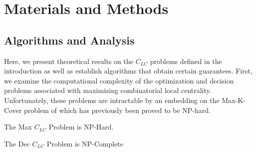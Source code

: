 
\section*{Materials and Methods}
\subsection*{Algorithms and Analysis}

Here, we present theoretical results on the $C_{LC}$ problems defined in the introduction as well as establish algorithms that obtain certain guarantees.  First, we examine the computational complexity of the optimization and decision problems associated with maximizing combinatorial local centrality.  Unfortunately, these problems are intractable by an embedding on the Max-K-Cover problem of \cite{feige98} which has previously been proved to be NP-hard.

\begin{thm}\label{nph-thm} The Max $C_{LC}$ Problem is NP-Hard. \end{thm}

\begin{thm}\label{dec-pbm} The Dec $C_{LC}$ Problem is NP-Complete \end{thm}

